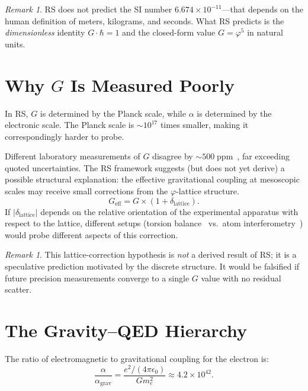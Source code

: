 \documentclass[12pt,a4paper]{article}
\theoremstyle{definition}
\theoremstyle{remark}
\newtheorem{remark}[theorem]{Remark}
\begin{document}
\begin{remark}
RS does not predict the SI number
$6.674 \times 10^{-11}$---that depends on the human definition of
meters, kilograms, and seconds.  What RS predicts is the
\emph{dimensionless} identity $G \cdot \hbar = 1$ and the
closed-form value $G = \varphi^5$ in natural units.
\end{remark}

\section{Why $G$ Is Measured Poorly}
\label{sec:poor}

In RS, $G$ is determined by the Planck scale, while $\alpha$
is determined by the electronic scale.  The Planck scale is
$\sim 10^{17}$ times smaller, making it correspondingly harder
to probe.

Different laboratory measurements of $G$ disagree by
$\sim 500\;\mathrm{ppm}$~\cite{Li2018}, far exceeding quoted
uncertainties.  The RS framework suggests (but does not yet
derive) a possible structural explanation: the effective
gravitational coupling at mesoscopic scales may receive
small corrections from the $\varphi$-lattice structure.
\begin{equation}
  G_{\mathrm{eff}} = G \times (1 + \delta_{\mathrm{lattice}}).
\end{equation}
If $|\delta_{\mathrm{lattice}}|$ depends on the relative
orientation of the experimental apparatus with respect to the
lattice, different setups (torsion balance~\cite{Li2018} vs.\
atom interferometry~\cite{Rosi2014}) would probe different
aspects of this correction.

\begin{remark}
This lattice-correction hypothesis is \emph{not} a derived
result of RS; it is a speculative prediction motivated by the
discrete structure.  It would be falsified if future precision
measurements converge to a single $G$ value with no residual
scatter.
\end{remark}

\section{The Gravity--QED Hierarchy}
\label{sec:hierarchy}

The ratio of electromagnetic to gravitational coupling for the
electron is:
\begin{equation}
  \frac{\alpha}{\alpha_{\mathrm{grav}}}
  = \frac{e^2/(4\pi\epsilon_0)}{G m_e^2}
  \approx 4.2 \times 10^{42}.
\end{equation}
\end{document}
